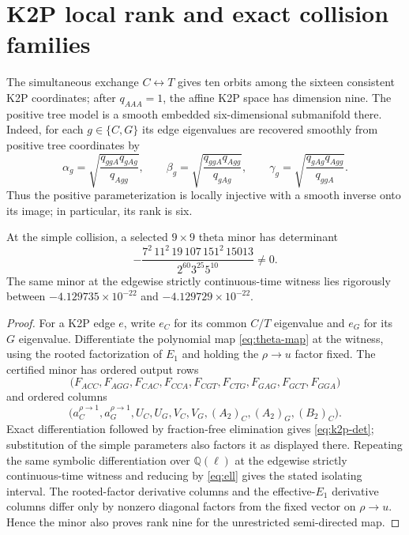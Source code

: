 \documentclass[11pt]{article}
\theoremstyle{remark}\newtheorem{remark}[theorem]{Remark}
\begin{document}
\section{K2P local rank and exact collision families}\label{sec:k2p-rank}
The simultaneous exchange $C\leftrightarrow T$ gives ten orbits among the sixteen consistent K2P coordinates; after $q_{AAA}=1$, the affine K2P space has dimension nine. The positive tree model is a smooth embedded six-dimensional submanifold there. Indeed, for each $g\in\{C,G\}$ its edge eigenvalues are recovered smoothly from positive tree coordinates by
\begin{equation}\label{eq:tree-recovery}
\alpha_g=\sqrt{\frac{q_{ggA}q_{gAg}}{q_{Agg}}},\qquad
\beta_g=\sqrt{\frac{q_{ggA}q_{Agg}}{q_{gAg}}},\qquad
\gamma_g=\sqrt{\frac{q_{gAg}q_{Agg}}{q_{ggA}}}.
\end{equation}
Thus the positive parameterization is locally injective with a smooth inverse onto its image; in particular, its rank is six.
\begin{proposition}\label{prop:k2p-rank}
At the simple collision, a selected $9\times9$ theta minor has determinant
\begin{equation}\label{eq:k2p-det}-\frac{7^2\,11^2\,19\,107\,151^2\,15013}{2^{60}3^{25}5^{10}}\ne0.\end{equation}
The same minor at the edgewise strictly continuous-time witness lies rigorously between $-4.129735\times10^{-22}$ and $-4.129729\times10^{-22}$.
\end{proposition}
\begin{proof}
For a K2P edge $e$, write $e_C$ for its common $C/T$ eigenvalue and $e_G$ for its $G$ eigenvalue. Differentiate the polynomial map \eqref{eq:theta-map} at the witness, using the rooted factorization of $E_1$ and holding the $\rho\to u$ factor fixed. The certified minor has ordered output rows
\[
\bigl(F_{ACC},F_{AGG},F_{CAC},F_{CCA},F_{CGT},F_{CTG},F_{GAG},F_{GCT},F_{GGA}\bigr)
\]
and ordered columns
\[
\bigl(a_C^{\rho\to1},a_G^{\rho\to1},U_C,U_G,V_C,V_G,
(A_2)_C,(A_2)_G,(B_2)_C\bigr).
\]
Exact differentiation followed by fraction-free elimination gives \eqref{eq:k2p-det}; substitution of the simple parameters also factors it as displayed there. Repeating the same symbolic differentiation over $\mathbb Q(\ell)$ at the edgewise strictly continuous-time witness and reducing by \eqref{eq:ell} gives the stated isolating interval. The rooted-factor derivative columns and the effective-$E_1$ derivative columns differ only by nonzero diagonal factors from the fixed vector on $\rho\to u$. Hence the minor also proves rank nine for the unrestricted semi-directed map.
\end{proof}
\end{document}
